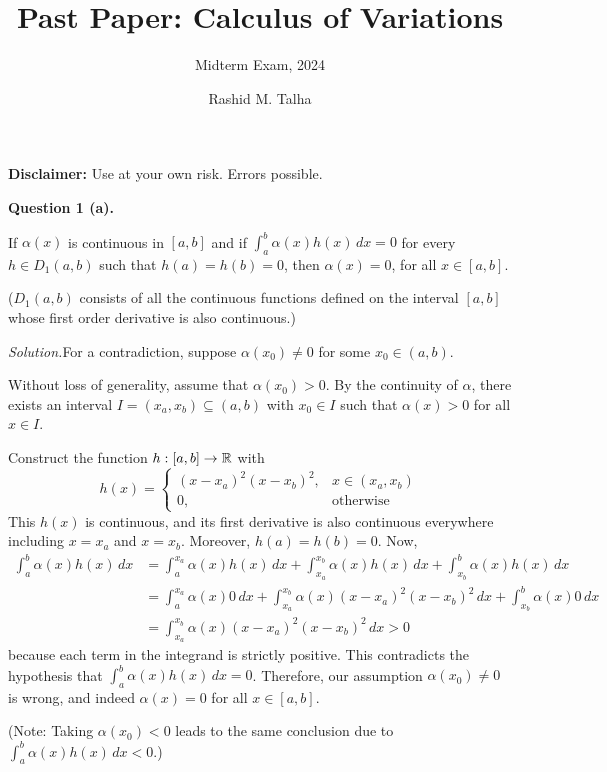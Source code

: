 \documentclass[11pt]{penrose}
\title{Past Paper: Calculus of Variations}
\subtitle{Midterm Exam, 2024}
\author{Rashid M. Talha}
\begin{document}
\newenvironment{problem}[2][Question]{\textbf{#1 #2.}\par}{}
\newcommand{\solution}{\textit{Solution.}\hspace{2mm}}

\maketitle

\textbf{Disclaimer:} Use at your own risk. Errors possible.

\begin{problem}{1 (a)}
    If $\alpha(x)$ is continuous in $[a,b]$ and if $\int_a^b \alpha(x) h(x) \,dx = 0$ for every $h \in D_{1}(a,b)$ such that $h(a) = h(b) = 0$, then $\alpha(x) = 0$, for all $x \in [a,b]$.

    ($D_{1}(a,b)$ consists of all the continuous functions defined on the interval $[a,b]$ whose first order derivative is also continuous.)

    \solution For a contradiction, suppose $\alpha(x_0) \neq 0$ for some $x_0 \in (a,b)$.

    Without loss of generality, assume that $\alpha(x_0) > 0$. By the continuity of $\alpha$, there exists an interval $I = (x_a, x_b) \subseteq (a,b)$ with $x_0 \in I$ such that $\alpha(x) > 0$ for all $x \in I$.

    Construct the function $h:[a,b] \to \mathbb{R}$ with
    \begin{equation*}
        h(x) =
        \begin{cases}
            (x - x_a)^2 (x - x_b)^2, & x \in (x_a, x_b) \\
            0, & \text{otherwise}
        \end{cases}
    \end{equation*}
    This $h(x)$ is continuous, and its first derivative is also continuous everywhere including $x = x_a$ and $x = x_b$. Moreover, $h(a) = h(b) = 0$. Now,
    \begin{align*}
        \int_a^b \alpha(x) h(x) \,dx
        &= \int_a^{x_a} \alpha(x) h(x) \,dx
        + \int_{x_a}^{x_b} \alpha(x) h(x) \,dx
        + \int_{x_b}^b \alpha(x) h(x) \,dx\\
        &= \int_a^{x_a} \alpha(x) 0 \,dx
        + \int_{x_a}^{x_b} \alpha(x) (x - x_a)^2 (x - x_b)^2 \,dx
        + \int_{x_b}^b \alpha(x) 0 \,dx\\
        &= \int_{x_a}^{x_b} \alpha(x) (x - x_a)^2 (x - x_b)^2 \,dx
        > 0
    \end{align*}
    because each term in the integrand is strictly positive. This contradicts the hypothesis that $\int_a^b \alpha(x) h(x) \,dx = 0$. Therefore, our assumption $\alpha(x_0) \neq 0$ is wrong, and indeed $\alpha(x) = 0$ for all $x \in [a,b]$.

    (Note: Taking $\alpha(x_0) < 0$ leads to the same conclusion due to $\int_a^b \alpha(x) h(x) \,dx < 0$.)
\end{problem}
\end{document}

